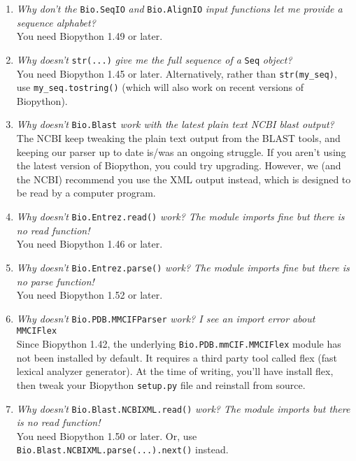 \documentclass{report}
\begin{document}
\begin{enumerate}
  \item \emph{Why don't the } \verb|Bio.SeqIO| \emph{and} \verb|Bio.AlignIO| \emph{input functions let me provide a sequence alphabet?} \\
  You need Biopython 1.49 or later.

  \item \emph{Why doesn't} \verb|str(...)| \emph{give me the full sequence of a} \verb|Seq| \emph{object?} \\
  You need Biopython 1.45 or later.  Alternatively, rather than \verb|str(my_seq)|, use \verb|my_seq.tostring()| (which will also work on recent versions of Biopython).
  
  \item \emph{Why doesn't} \verb|Bio.Blast| \emph{work with the latest plain text NCBI blast output?} \\
  The NCBI keep tweaking the plain text output from the BLAST tools, and keeping our parser up to date is/was an ongoing struggle.
  If you aren't using the latest version of Biopython, you could try upgrading.
  However, we (and the NCBI) recommend you use the XML output instead, which is designed to be read by a computer program.

  \item \emph{Why doesn't} \verb|Bio.Entrez.read()| \emph{work? The module imports fine but there is no read function!} \\
  You need Biopython 1.46 or later.

  \item \emph{Why doesn't} \verb|Bio.Entrez.parse()| \emph{work? The module imports fine but there is no parse function!} \\
  You need Biopython 1.52 or later.

  \item \emph{Why doesn't} \verb|Bio.PDB.MMCIFParser| \emph{work? I see an import error about} \verb|MMCIFlex| \\
  Since Biopython 1.42, the underlying \verb|Bio.PDB.mmCIF.MMCIFlex| module has
  not been installed by default.  It requires a third party tool called flex
  (fast lexical analyzer generator). At the time of writing, you'll have install
  flex, then tweak your Biopython \verb|setup.py| file and reinstall from source.

  \item \emph{Why doesn't} \verb|Bio.Blast.NCBIXML.read()| \emph{work? The module imports but there is no read function!} \\
  You need Biopython 1.50 or later.  Or, use \texttt{Bio.Blast.NCBIXML.parse(...).next()} instead.
  

\end{enumerate}
\end{document}
